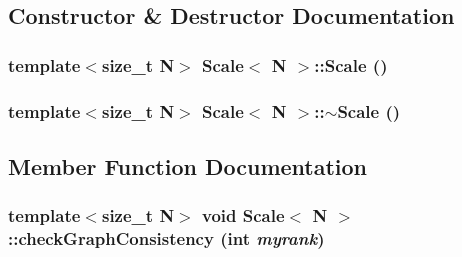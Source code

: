 \subsection{Constructor \& Destructor Documentation}
\hypertarget{classScale_a3a5aac56c720ec136899e4ea321d8377}{
\subsubsection[{Scale}]{\setlength{\rightskip}{0pt plus 5cm}template$<$size\_\-t N$>$ {\bf Scale}$<$ N $>$::{\bf Scale} ()}}
\label{classScale_a3a5aac56c720ec136899e4ea321d8377}
\hypertarget{classScale_a76e8ff2b4110cef6885e96bb4dfaf159}{
\subsubsection[{$\sim$Scale}]{\setlength{\rightskip}{0pt plus 5cm}template$<$size\_\-t N$>$ {\bf Scale}$<$ N $>$::$\sim${\bf Scale} ()}}
\label{classScale_a76e8ff2b4110cef6885e96bb4dfaf159}


\subsection{Member Function Documentation}
\hypertarget{classScale_a8df0d89e4b1df03382d9a8c0ddc43ba0}{
\subsubsection[{checkGraphConsistency}]{\setlength{\rightskip}{0pt plus 5cm}template$<$size\_\-t N$>$ void {\bf Scale}$<$ N $>$::checkGraphConsistency (int {\em myrank})}}
\label{classScale_a8df0d89e4b1df03382d9a8c0ddc43ba0}

